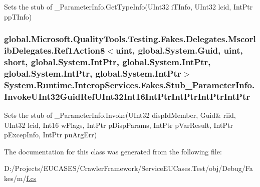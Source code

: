 Sets the stub of \-\_\-\-Parameter\-Info.\-Get\-Type\-Info(\-U\-Int32 i\-T\-Info, U\-Int32 lcid, Int\-Ptr pp\-T\-Info)

\hypertarget{class_system_1_1_runtime_1_1_interop_services_1_1_fakes_1_1_stub___parameter_info_abedeb6bfd7d0479144b565dea3e8a17a}{
\subsubsection[{Invoke\-U\-Int32\-Guid\-Ref\-U\-Int32\-Int16\-Int\-Ptr\-Int\-Ptr\-Int\-Ptr\-Int\-Ptr}]{\setlength{\rightskip}{0pt plus 5cm}global.\-Microsoft.\-Quality\-Tools.\-Testing.\-Fakes.\-Delegates.\-Mscorlib\-Delegates.\-Ref1\-Action8$<$uint, global.\-System.\-Guid, uint, short, global.\-System.\-Int\-Ptr, global.\-System.\-Int\-Ptr, global.\-System.\-Int\-Ptr, global.\-System.\-Int\-Ptr$>$ System.\-Runtime.\-Interop\-Services.\-Fakes.\-Stub\-\_\-\-Parameter\-Info.\-Invoke\-U\-Int32\-Guid\-Ref\-U\-Int32\-Int16\-Int\-Ptr\-Int\-Ptr\-Int\-Ptr\-Int\-Ptr}}\label{class_system_1_1_runtime_1_1_interop_services_1_1_fakes_1_1_stub___parameter_info_abedeb6bfd7d0479144b565dea3e8a17a}


Sets the stub of \-\_\-\-Parameter\-Info.\-Invoke(U\-Int32 disp\-Id\-Member, Guid\& riid, U\-Int32 lcid, Int16 w\-Flags, Int\-Ptr p\-Disp\-Params, Int\-Ptr p\-Var\-Result, Int\-Ptr p\-Excep\-Info, Int\-Ptr pu\-Arg\-Err)



The documentation for this class was generated from the following file\-:\begin{DoxyCompactItemize}
\item 
D\-:/\-Projects/\-E\-U\-C\-A\-S\-E\-S/\-Crawler\-Framework/\-Service\-E\-U\-Cases.\-Test/obj/\-Debug/\-Fakes/m/\hyperlink{m_2f_8cs}{f.\-cs}\end{DoxyCompactItemize}
